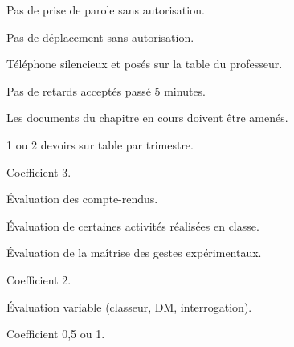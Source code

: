 \newpage
\pasDePagination


\large

\begin{listePoints}
  \item {}
  \item Pas de prise de parole sans autorisation.
  \item Pas de déplacement sans autorisation.
  \item Téléphone silencieux et posés sur la table du professeur.
  \item Pas de retards acceptés passé 5 minutes.
  \item Les documents du chapitre en cours doivent  être amenés.
\end{listePoints}

\begin{center}
\end{center}

\vspace*{-0.2cm}
\ligne




\begin{listePoints}
  \item 1 ou 2 devoirs sur table par trimestre.
  \item {}
  \item Coefficient 3.
\end{listePoints}



\begin{listePoints}
  \item Évaluation des compte-rendus.
  \item Évaluation de certaines activités réalisées en classe.
  \item Évaluation de la maîtrise des gestes expérimentaux.
  \item Coefficient 2.
\end{listePoints}



\begin{listePoints}
  \item Évaluation variable (classeur, DM, interrogation).
  \item Coefficient 0,5 ou 1.
\end{listePoints}


